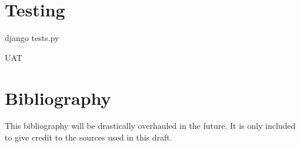 \documentclass[12pt, a4paper]{article}
\begin{document}


\newpage

\newpage


\newpage
\tableofcontents


\newpage






\newpage


\section{Testing}
django tests.py

UAT
\newpage




\section{Bibliography}
This bibliography will be drastically overhauled in the future. It is only included to give credit to the sources used in this draft.
\end{document}
